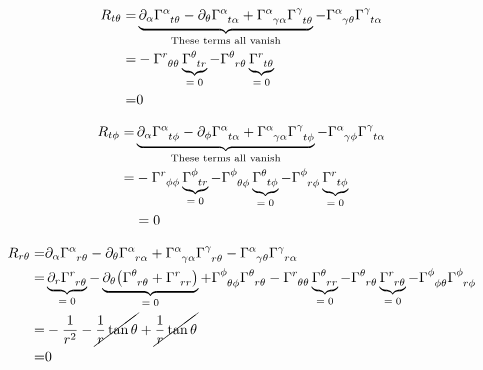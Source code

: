 \documentclass[]{article}
\begin{document}
\begin{align*}
	R_{t\theta} =& \underbrace{\partial_\alpha \Gamma\indices{^\alpha_{t\theta}} - \partial_\theta \Gamma\indices{^\alpha_{t\alpha}} + \Gamma\indices{^\alpha_{\gamma\alpha}} \Gamma\indices{^\gamma_{t\theta}}}_\text{These terms all vanish} - \Gamma\indices{^\alpha_{\gamma\theta}} \Gamma\indices{^\gamma_{t\alpha}}\\
	=&  - \Gamma\indices{^r_{\theta\theta}} \underbrace{\Gamma\indices{^\theta_{tr}}}_\text{$=0$}  - \Gamma\indices{^\theta_{r\theta}} \underbrace{\Gamma\indices{^r_{t\theta}}}_\text{$=0$} \\
	=&0 
\end{align*}

\begin{align*}
	R_{t\phi} =& \underbrace{\partial_\alpha \Gamma\indices{^\alpha_{t\phi}} - \partial_\phi \Gamma\indices{^\alpha_{t\alpha}} + \Gamma\indices{^\alpha_{\gamma\alpha}} \Gamma\indices{^\gamma_{t\phi}} }_\text{These terms all vanish}- \Gamma\indices{^\alpha_{\gamma\phi}} \Gamma\indices{^\gamma_{t\alpha}}\\
	=& - \Gamma\indices{^r_{\phi\phi}} \underbrace{\Gamma\indices{^\phi_{tr}}}_\text{$=0$} - \Gamma\indices{^\phi_{\theta\phi}} \underbrace{\Gamma\indices{^\theta_{t\phi}}}_\text{$=0$}- \Gamma\indices{^\phi_{r\phi}} \underbrace{\Gamma\indices{^r_{t\phi}}}_\text{$=0$}\\
	&=0
\end{align*}

\begin{align*}
	R_{r\theta} =& \partial_\alpha \Gamma\indices{^\alpha_{r\theta}} - \partial_\theta \Gamma\indices{^\alpha_{r\alpha}} + \Gamma\indices{^\alpha_{\gamma\alpha}} \Gamma\indices{^\gamma_{r\theta}} - \Gamma\indices{^\alpha_{\gamma\theta}} \Gamma\indices{^\gamma_{r\alpha}}\\
	=& \underbrace{\partial_r \Gamma\indices{^r_{r\theta}}}_\text{$=0$} - \underbrace{\partial_\theta \big(\Gamma\indices{^\theta_{r\theta}}+\Gamma\indices{^r_{rr}}\big)}_\text{$=0$} + \Gamma\indices{^\phi_{\theta\phi}} \Gamma\indices{^\theta_{r\theta}} - \Gamma\indices{^r_{\theta\theta}} \underbrace{\Gamma\indices{^\theta_{rr}}}_\text{$=0$} - \Gamma\indices{^\theta_{r\theta}} \underbrace{\Gamma\indices{^r_{r\theta}}}_\text{$=0$}- \Gamma\indices{^\phi_{\phi\theta}} \Gamma\indices{^\phi_{r\phi}}\\
	=&-\frac{1}{r^2} -\cancel{\frac{1}{r}\tan \theta} + \cancel{\frac{1}{r}\tan \theta}\\
	=& 0
\end{align*}
\end{document}
